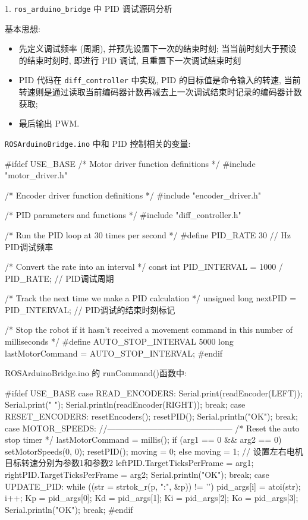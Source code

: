 \documentclass[openany, fontset=windowsold]{ctexbook}
\theoremstyle{kaiti}
\theoremstyle{normal}
\begin{document}
1. \verb|ros_arduino_bridge| 中 PID 调试源码分析

基本思想:

\begin{itemize}
  \item 先定义调试频率 (周期), 并预先设置下一次的结束时刻; 
  当当前时刻大于预设的结束时刻时, 即进行 PID 调试, 且重置下一次调试结束时刻
  \item PID 代码在 \verb|diff_controller| 中实现, PID 的目标值是命令输入的转速, 当前转速则是通过读取当前编码器计数再减去上一次调试结束时记录的编码器计数获取; 
  \item 最后输出 PWM.
\end{itemize}

\verb|ROSArduinoBridge.ino| 中和 PID 控制相关的变量:

\begin{cpp}
  #ifdef USE_BASE
    /* Motor driver function definitions */
    #include "motor_driver.h"

    /* Encoder driver function definitions */
    #include "encoder_driver.h"

    /* PID parameters and functions */
    #include "diff_controller.h"

    /* Run the PID loop at 30 times per second */
    #define PID_RATE           30     // Hz PID调试频率

    /* Convert the rate into an interval */
    const int PID_INTERVAL = 1000 / PID_RATE; // PID调试周期

    /* Track the next time we make a PID calculation */
    unsigned long nextPID = PID_INTERVAL; // PID调试的结束时刻标记

    /* Stop the robot if it hasn't received a movement command
    in this number of milliseconds */
    #define AUTO_STOP_INTERVAL 5000
    long lastMotorCommand = AUTO_STOP_INTERVAL;
  #endif

  ROSArduinoBridge.ino 的 runCommand()函数中:

  #ifdef USE_BASE
    case READ_ENCODERS:
      Serial.print(readEncoder(LEFT));
      Serial.print(" ");
      Serial.println(readEncoder(RIGHT));
      break;
    case RESET_ENCODERS:
      resetEncoders();
      resetPID();
      Serial.println("OK");
      break;
    case MOTOR_SPEEDS: //---------------------------------------------
      /* Reset the auto stop timer */
      lastMotorCommand = millis();
      if (arg1 == 0 && arg2 == 0) {
        setMotorSpeeds(0, 0);
        resetPID();
        moving = 0;
      }
      else moving = 1;
      // 设置左右电机目标转速分别为参数1和参数2
      leftPID.TargetTicksPerFrame = arg1;
      rightPID.TargetTicksPerFrame = arg2;
      Serial.println("OK"); 
      break;
    case UPDATE_PID:
      while ((str = strtok_r(p, ":", &p)) != '\0') {
        pid_args[i] = atoi(str);
        i++;
      }
      Kp = pid_args[0];
      Kd = pid_args[1];
      Ki = pid_args[2];
      Ko = pid_args[3];
      Serial.println("OK");
      break;
  #endif


\end{cpp}
\end{document}
